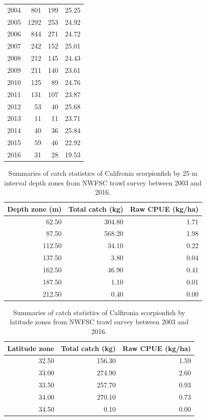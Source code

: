 \documentclass[12pt,]{article}
\begin{document}
\begin{table}[ht]
\begin{tabular}{rrrr}
  2004 & 801 & 199 & 25.25 \\ 
  2005 & 1292 & 253 & 24.92 \\ 
  2006 & 844 & 271 & 24.72 \\ 
  2007 & 242 & 152 & 25.01 \\ 
  2008 & 212 & 145 & 24.43 \\ 
  2009 & 211 & 140 & 23.61 \\ 
  2010 & 125 &  89 & 24.76 \\ 
  2011 & 131 & 107 & 23.87 \\ 
  2012 &  53 &  40 & 25.68 \\ 
  2013 &  11 &  11 & 23.71 \\ 
  2014 &  40 &  36 & 25.84 \\ 
  2015 &  59 &  46 & 22.92 \\ 
  2016 &  31 &  28 & 19.53 \\ 
   \hline
\end{tabular}
\end{table}

\FloatBarrier

\begin{table}[ht]
\centering
\caption{Summaries of catch statistics of 
                                          Califronia scorpionfish by 25 m interval depth zones 
                                          from NWFSC trawl survey between 2003 and 2016.} 
\label{tab:Fleet8_NWFSCTrawl_catchdepth}
\begin{tabular}{rrr}
  \hline
Depth zone (m) & Total catch (kg) & Raw CPUE (kg/ha) \\ 
  \hline
62.50 & 304.80 & 1.71 \\ 
  87.50 & 568.20 & 1.98 \\ 
  112.50 & 34.10 & 0.22 \\ 
  137.50 & 3.80 & 0.04 \\ 
  162.50 & 46.90 & 0.41 \\ 
  187.50 & 1.10 & 0.01 \\ 
  212.50 & 0.40 & 0.00 \\ 
   \hline
\end{tabular}
\end{table}\begin{table}[ht]
\centering
\caption{Summaries of catch statistics of 
                                          Calfironia scorpionfish by latitude zones 
                                          from NWFSC trawl survey between 2003 and 2016.} 
\label{tab:Fleet8_NWFSCTrawl_catchlat}
\begin{tabular}{rrr}
  \hline
Latitude zone & Total catch (kg) & Raw CPUE (kg/ha) \\ 
  \hline
32.50 & 156.30 & 1.59 \\ 
  33.00 & 274.90 & 2.60 \\ 
  33.50 & 257.70 & 0.93 \\ 
  34.00 & 270.10 & 0.73 \\ 
  34.50 & 0.10 & 0.00 \\ 
   \hline
\end{tabular}
\end{table}
\end{document}

